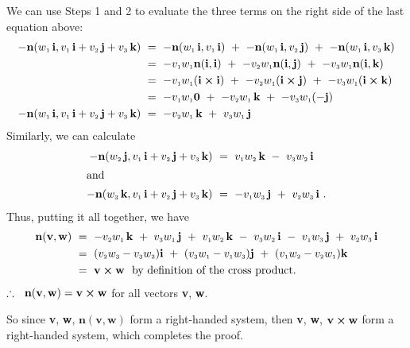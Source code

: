 We can use Steps 1 and 2 to evaluate the three terms on the right side of the last equation above:
\begin{align*}
 -\textbf{n}(\ssub{w}{1}\,\textbf{i},\vecthreeijk{v}) ~&=~ -\textbf{n}(\ssub{w}{1}\,\textbf{i},\ssub{v}{1}\,\textbf{i}) ~+~
 -\textbf{n}(\ssub{w}{1}\,\textbf{i},\ssub{v}{2}\,\textbf{j}) ~+~
 -\textbf{n}(\ssub{w}{1}\,\textbf{i},\ssub{v}{3}\,\textbf{k})\\
 &=~ -\ssub{v}{1}\ssub{w}{1}\textbf{n}(\textbf{i},\textbf{i}) ~+~ -\ssub{v}{2}\ssub{w}{1}\textbf{n}(\textbf{i},\textbf{j})
  ~+~ -\ssub{v}{3}\ssub{w}{1}\textbf{n}(\textbf{i},\textbf{k})\\
 &=~ -\ssub{v}{1}\ssub{w}{1}(\Crossprod{\textbf{i}}{\textbf{i}}) ~+~
    -\ssub{v}{2}\ssub{w}{1}(\Crossprod{\textbf{i}}{\textbf{j}}) ~+~
    -\ssub{v}{3}\ssub{w}{1}(\Crossprod{\textbf{i}}{\textbf{k}})\\
 &=~ -\ssub{v}{1}\ssub{w}{1}\textbf{0} ~+~ -\ssub{v}{2}\ssub{w}{1}\,\textbf{k} ~+~ -\ssub{v}{3}\ssub{w}{1}(-\textbf{j})\\
 -\textbf{n}(\ssub{w}{1}\,\textbf{i},\vecthreeijk{v}) ~&=~ -\ssub{v}{2}\ssub{w}{1}\,\textbf{k} ~+~
  \ssub{v}{3}\ssub{w}{1}\,\textbf{j}
\end{align*}
Similarly, we can calculate
\begin{align*}
 -\textbf{n}(\ssub{w}{2}\,\textbf{j},\vecthreeijk{v}) ~&=~ \ssub{v}{1}\ssub{w}{2}\,\textbf{k} ~-~
  \ssub{v}{3}\ssub{w}{2}\,\textbf{i}\\
 \intertext{and}
 -\textbf{n}(\ssub{w}{3}\,\textbf{k},\vecthreeijk{v}) ~&=~ -\ssub{v}{1}\ssub{w}{3}\,\textbf{j} ~+~
  \ssub{v}{2}\ssub{w}{3}\,\textbf{i} ~.
\end{align*}
Thus, putting it all together, we have
\begin{align*}
 \textbf{n}(\textbf{v},\textbf{w}) ~&=~ -\ssub{v}{2}\ssub{w}{1}\,\textbf{k} ~+~ \ssub{v}{3}\ssub{w}{1}\,\textbf{j} ~+~
  \ssub{v}{1}\ssub{w}{2}\,\textbf{k} ~-~ \ssub{v}{3}\ssub{w}{2}\,\textbf{i} ~-~ \ssub{v}{1}\ssub{w}{3}\,\textbf{j} ~+~
  \ssub{v}{2}\ssub{w}{3}\,\textbf{i}\\
 &=~ (\ssub{v}{2}\ssub{w}{3} - \ssub{v}{3}\ssub{w}{2})\textbf{i} ~+~ (\ssub{v}{3}\ssub{w}{1} -
  \ssub{v}{1}\ssub{w}{3})\textbf{j} ~+~ (\ssub{v}{1}\ssub{w}{2} - \ssub{v}{2}\ssub{w}{1})\textbf{k}\\
 &=~ \Crossprod{\textbf{v}}{\textbf{w}} \text{~~by definition of the cross product.}
\end{align*}
$\therefore ~~ \textbf{n}(\textbf{v},\textbf{w}) = \Crossprod{\textbf{v}}{\textbf{w}}$ for all vectors \textbf{v},
\textbf{w}.\enskip\checkmark\vspace{1mm}
\par\noindent So since \textbf{v}, \textbf{w}, $\textbf{n}(\textbf{v},\textbf{w})$ form a right-handed system, then
\textbf{v}, \textbf{w}, $\Crossprod{\textbf{v}}{\textbf{w}}$ form a right-handed system, which completes the proof.

